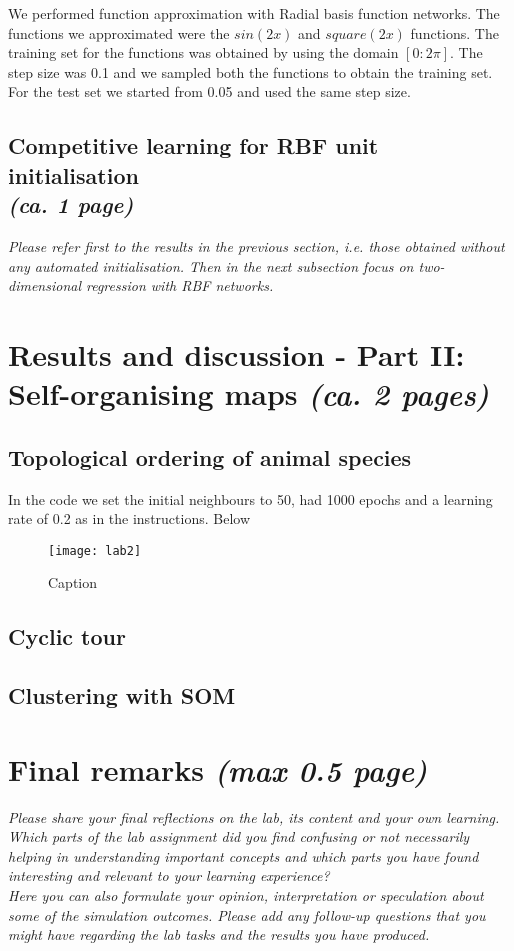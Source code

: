 \documentclass[a4paper]{article}
\begin{document}
We performed function approximation with Radial basis function networks. The functions we approximated were the $sin(2x)$ and $square(2x)$ functions. The training set for the functions was obtained by using the domain $[0:2\pi]$. The step size was 0.1 and we sampled both the functions to obtain the training set. For the test set we started from 0.05 and used the same step size.  



\subsection{Competitive learning for RBF unit initialisation\\ \normalsize{\textit{(ca. 1 page)}}}
\textit{Please refer first to the results in the previous section, i.e. those obtained without any automated initialisation. Then in the next subsection focus on two-dimensional regression with RBF networks.}


\section{Results and discussion - Part II: Self-organising maps \normalsize{\textit{(ca. 2 pages)}}}

\subsection{Topological ordering of animal species}
In the code we set the initial neighbours to 50, had 1000 epochs and a learning rate of 0.2 as in the instructions. Below 

\begin{figure}
    \centering
    \texttt{[image: lab2]}
    \caption{Caption}
    \label{fig:enter-label}
\end{figure}


\subsection{Cyclic tour}

\subsection{Clustering with SOM}

\section{Final remarks \normalsize{\textit{(max 0.5 page)}}}
\textit{Please share your final reflections on the lab, its content and your own learning. Which parts of the lab assignment did you find confusing or not necessarily helping in understanding important concepts and which parts you have found interesting and relevant to your learning experience? \\
Here you can also formulate your opinion, interpretation or speculation about some of the simulation outcomes. Please add any follow-up questions that you might have regarding the lab tasks and the results you have produced.}
\end{document}
